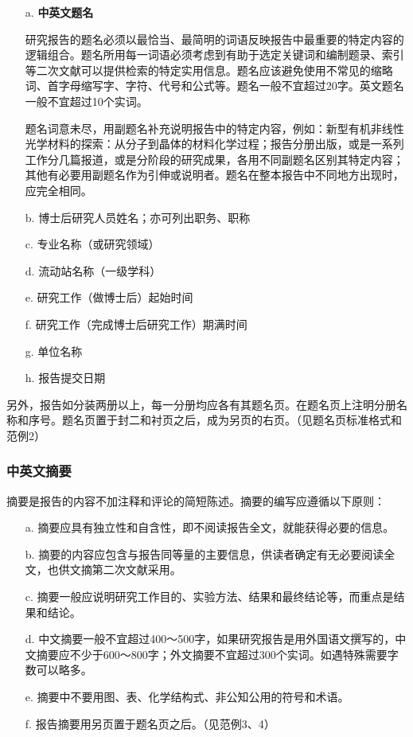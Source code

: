 \begin{itemize}[leftmargin=2em]
    \item[a.] \textbf{中英文题名}

    研究报告的题名必须以最恰当、最简明的词语反映报告中最重要的特定内容的逻辑组合。题名所用每一词语必须考虑到有助于选定关键词和编制题录、索引等二次文献可以提供检索的特定实用信息。题名应该避免使用不常见的缩略词、首字母缩写字、字符、代号和公式等。题名一般不宜超过20字。英文题名一般不宜超过10个实词。

    题名词意未尽，用副题名补充说明报告中的特定内容，例如：新型有机非线性光学材料的探索：从分子到晶体的材料化学过程；报告分册出版，或是一系列工作分几篇报道，或是分阶段的研究成果，各用不同副题名区别其特定内容；其他有必要用副题名作为引伸或说明者。题名在整本报告中不同地方出现时，应完全相同。

    \item[b.] 博士后研究人员姓名；亦可列出职务、职称
    \item[c.] 专业名称（或研究领域）
    \item[d.] 流动站名称（一级学科）
    \item[e.] 研究工作（做博士后）起始时间
    \item[f.] 研究工作（完成博士后研究工作）期满时间
    \item[g.] 单位名称
    \item[h.] 报告提交日期
\end{itemize}

另外，报告如分装两册以上，每一分册均应各有其题名页。在题名页上注明分册名称和序号。题名页置于封二和衬页之后，成为另页的右页。（见题名页标准格式和范例2）

\subsubsection{中英文摘要}

摘要是报告的内容不加注释和评论的简短陈述。摘要的编写应遵循以下原则：

\begin{itemize}[leftmargin=2em]
    \item[a.] 摘要应具有独立性和自含性，即不阅读报告全文，就能获得必要的信息。
    \item[b.] 摘要的内容应包含与报告同等量的主要信息，供读者确定有无必要阅读全文，也供文摘第二次文献采用。
    \item[c.] 摘要一般应说明研究工作目的、实验方法、结果和最终结论等，而重点是结果和结论。
    \item[d.] 中文摘要一般不宜超过400～500字，如果研究报告是用外国语文撰写的，中文摘要应不少于600～800字；外文摘要不宜超过300个实词。如遇特殊需要字数可以略多。
    \item[e.] 摘要中不要用图、表、化学结构式、非公知公用的符号和术语。
    \item[f.] 报告摘要用另页置于题名页之后。（见范例3、4）
\end{itemize}

